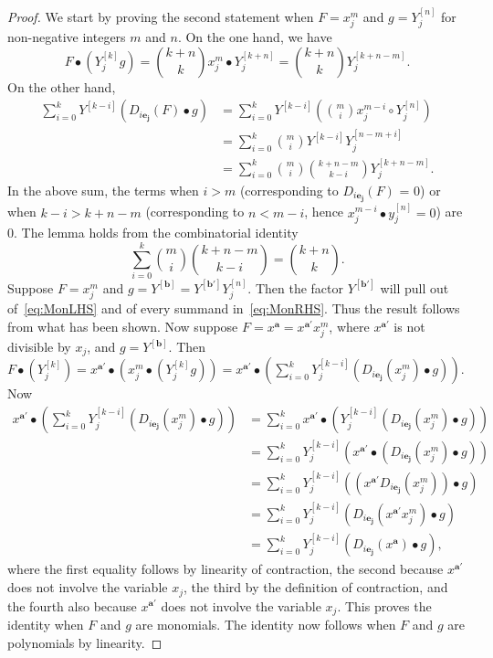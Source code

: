 \documentclass[12pt, reqno]{amsart}
\numberwithin{equation}{section}
\newcommand{\ba}{\mathbf{a}}
\newcommand{\bb}{\mathbf{b}}
\newcommand{\contract}{\bullet}
\theoremstyle{plain} %
\theoremstyle{definition}
\theoremstyle{remark}
\begin{document}
\begin{proof}
We start by proving the second statement when $F=x_j^{m}$ and $g=Y_j^{[n]}$ for non-negative integers $m$ and $n$. On the one hand, we have 
\begin{equation}\label{eq:MonLHS}
F\contract (Y_j^{[k]}g) = {k+n\choose k} x_j^{m} \contract Y_j^{[k+n]} = {k+n\choose k} Y_j^{[k+n-m]}.
\end{equation}
On the other hand, 
\begin{align}\label{eq:MonRHS}
\sum_{i=0}^k Y^{[k-i]}(D_{i\mathbf{e_j}}(F)\contract g)
&= \sum_{i=0}^k Y^{[k-i]} \left( {m \choose i} x_j^{m-i} \circ Y_j^{[n]} \right) \nonumber \\
&= \sum_{i=0}^k {m \choose i} Y^{[k-i]} Y_j^{[n-m+i]} \\
&= \sum_{i=0}^k {m \choose i}{k+n-m \choose k-i} Y_j^{[k+n-m]}. \nonumber
\end{align}
In the above sum, the terms when $i > m$ (corresponding to $D_{i\mathbf{e_j}}(F)$ = 0) or when $k-i>k+n-m$ (corresponding to $n<m-i$, hence $x_j^{m-i} \contract y_j^{[n]}=0$) are $0$. The lemma holds from the combinatorial identity
\[
\sum_{i=0}^k {m \choose i}{k+n-m \choose k-i} = {k+n \choose k}.
\]
Suppose $F=x_j^m$ and $g=Y^{[\bb]}=Y^{[\bb']}Y_j^{[n]}$.  Then the factor $Y^{[\bb']}$ will pull out of~\eqref{eq:MonLHS} and of every summand in~\eqref{eq:MonRHS}.  Thus the result follows from what has been shown.  Now suppose $F=x^{\ba}=x^{\ba'}x_j^{m}$, where $x^{\ba'}$ is not divisible by $x_j$, and $g=Y^{[\bb]}$.  Then $F\contract (Y_j^{[k]})=x^{\ba'}\contract (x_j^{m}\contract (Y_j^{[k]}g))=x^{\ba'}\contract\left(\sum_{i=0}^k Y_j^{[k-i]}(D_{i\mathbf{e_j}}(x_j^m)\contract g)\right)$.  Now
\begin{align*}
x^{\ba'}\contract\left(\sum_{i=0}^k Y_j^{[k-i]}(D_{i\mathbf{e_j}}(x_j^m)\contract g)\right) & =\sum_{i=0}^k x^{\ba'}\contract \left(Y_j^{[k-i]}(D_{i\mathbf{e_j}}(x_j^m)\contract g)\right)\\
&=\sum_{i=0}^k Y_j^{[k-i]}\left(x^{\ba'}\contract(D_{i\mathbf{e_j}}(x_j^m)\contract g)\right)\\
& =\sum_{i=0}^k Y_j^{[k-i]}\left((x^{\ba'}D_{i\mathbf{e_j}}(x_j^m))\contract g\right)\\
& =\sum_{i=0}^k Y_j^{[k-i]}\left(D_{i\mathbf{e_j}}(x^{\ba'}x_j^m)\contract g\right)\\
& =\sum_{i=0}^k Y_j^{[k-i]}\left(D_{i\mathbf{e_j}}(x^{\ba})\contract g\right),
\end{align*}
where the first equality follows by linearity of contraction, the second because $x^{\ba'}$ does not involve the variable $x_j$, the third by the definition of contraction, and the fourth also because $x^{\ba'}$ does not involve the variable $x_j$.  This proves the identity when $F$ and $g$ are monomials.  The identity now follows when $F$ and $g$ are polynomials by linearity.
\end{proof}
\end{document}
